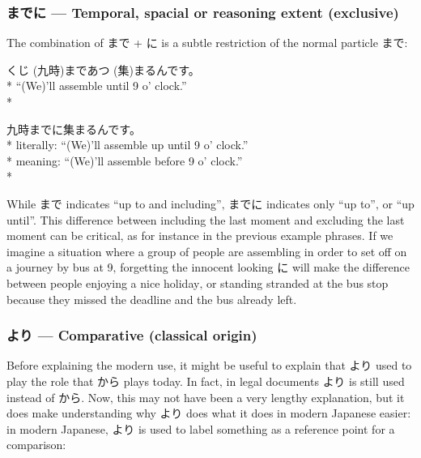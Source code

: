 \documentclass[11pt, b5paper, twoside, openright, onecolumn]{book}
\makeatletter
\newcommand*{\rubystack}[2]{{\relscale{0.5}%
  \begin{tabular}[b]{@{}c@{}}%
    {#1}\\%
   {\textscale{2}{#2}}%
  \end{tabular}}%
}
\DeclareRobustCommand*{\ruby}[2]{%
  \mbox{%
    \setlength{\parskip}{0ex}%
    \BeginAccSupp{method=pdfstringdef,ActualText={#1}}%
      \rubystack{\phantom{#2}}{#1}%
      \llap{%
        \rubystack{#2}{\phantom{#1}}%
      }%
    \EndAccSupp{}%
  }%
}
\renewcommand*{\ruby}[2]{#2 (#1)}%
\newenvironment{exampleblock}{
\setlength{\parindent}{0.6in}
\begin{minipage}[t]{\dimexpr\textwidth-\parindent}}
{\end{minipage}}
\makeatother
\begin{document}
\subsubsection{までに — Temporal‚ spacial or reasoning extent (exclusive)}

The combination of まで + に is a subtle restriction of the normal particle まで:

\vspace{0.4cm}
\begin{exampleblock}
\ruby{九時}{くじ}まで\ruby{集}{あつ}まるんです。 \\* 
“(We)’ll assemble until 9 o’ clock.” \\* 
\end{exampleblock}
\vspace{0.2cm}

\begin{exampleblock}
九時までに集まるんです。 \\* 
literally: “(We)’ll assemble up until 9 o’ clock.” \\* 
meaning: “(We)’ll assemble before 9 o’ clock.” \\* 
\end{exampleblock}
\vspace{0.2cm}

While まで indicates “up to and including”‚ までに indicates only “up to”‚ or “up until”. This difference between including the last moment and excluding the last moment can be critical‚ as for instance in the previous example phrases. If we imagine a situation where a group of people are assembling in order to set off on a journey by bus at 9‚ forgetting the innocent looking に will make the difference between people enjoying a nice holiday‚ or standing stranded at the bus stop because they missed the deadline and the bus already left.

\subsubsection{より — Comparative (classical origin)}

Before explaining the modern use‚ it might be useful to explain that より used to play the role that から plays today. In fact‚ in legal documents より is still used instead of から. Now‚ this may not have been a very lengthy explanation‚ but it does make understanding why より does what it does in modern Japanese easier: in modern Japanese‚ より is used to label something as a reference point for a comparison:
\end{document}
